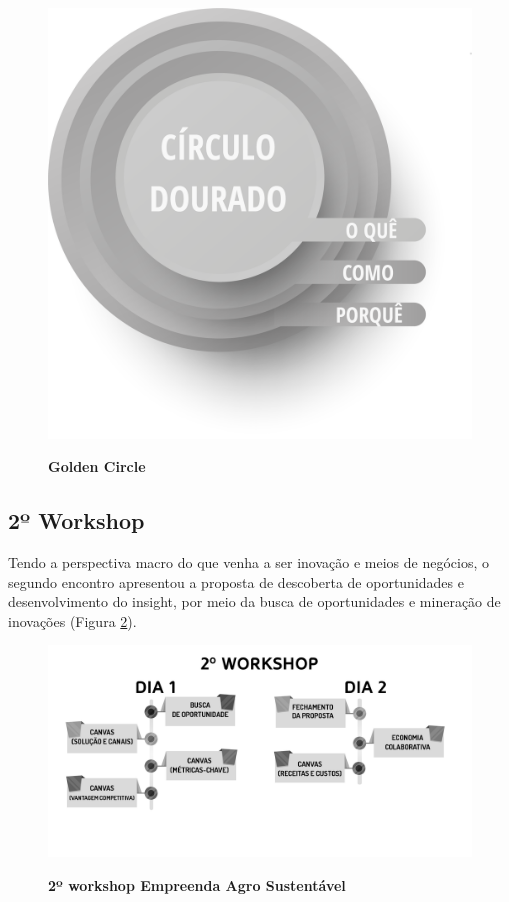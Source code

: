 \begin{figure}[H]
\centering
\caption{\textbf{Golden Circle}}
\includegraphics[scale=0.25]{Imagens/circulo_dourado.png}
\label{figura_5}
\end{figure}

\subsection{2º Workshop}

Tendo a perspectiva macro do que venha a ser inovação e meios de negócios, o segundo encontro apresentou a proposta de descoberta de oportunidades e desenvolvimento do insight, por meio da busca de oportunidades e mineração de inovações (Figura \ref{figura_31}).


\begin{figure}[H]
\centering
\caption{\textbf{2º workshop Empreenda Agro Sustentável}}
\includegraphics[scale=0.4]{Imagens/workshop-02.png}
\label{figura_31}
\end{figure}

